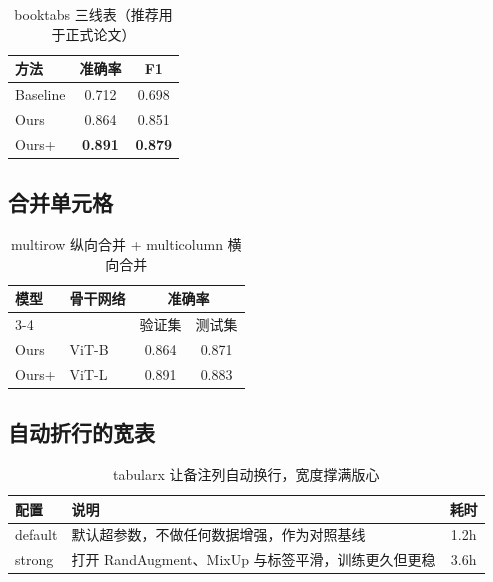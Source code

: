 \documentclass[UTF8,11pt]{ctexart}
\begin{document}
\begin{table}[H]
  \centering
  \caption{booktabs 三线表（推荐用于正式论文）}
  \label{tab:booktabs}
  \begin{tabular}{lcc}
    \toprule
    方法 & 准确率 & F1 \\
    \midrule
    Baseline & 0.712 & 0.698 \\
    Ours     & 0.864 & 0.851 \\
    Ours+    & \textbf{0.891} & \textbf{0.879} \\
    \bottomrule
  \end{tabular}
\end{table}

\subsection{合并单元格}

\begin{table}[H]
  \centering
  \caption{multirow 纵向合并 + multicolumn 横向合并}
  \label{tab:multirow}
  \begin{tabular}{llcc}
    \toprule
    \multirow{2}{*}{模型} & \multirow{2}{*}{骨干网络} & \multicolumn{2}{c}{准确率} \\
    \cmidrule(lr){3-4}
     & & 验证集 & 测试集 \\
    \midrule
    Ours   & ViT-B & 0.864 & 0.871 \\
    Ours+  & ViT-L & 0.891 & 0.883 \\
    \bottomrule
  \end{tabular}
\end{table}

\subsection{自动折行的宽表}

\begin{table}[H]
  \centering
  \caption{tabularx 让备注列自动换行，宽度撑满版心}
  \label{tab:tabularx}
  \begin{tabularx}{\linewidth}{@{}lXc@{}}
    \toprule
    配置 & 说明 & 耗时 \\
    \midrule
    default & 默认超参数，不做任何数据增强，作为对照基线 & 1.2h \\
    strong  & 打开 RandAugment、MixUp 与标签平滑，训练更久但更稳 & 3.6h \\
    \bottomrule
  \end{tabularx}
\end{table}
\end{document}
